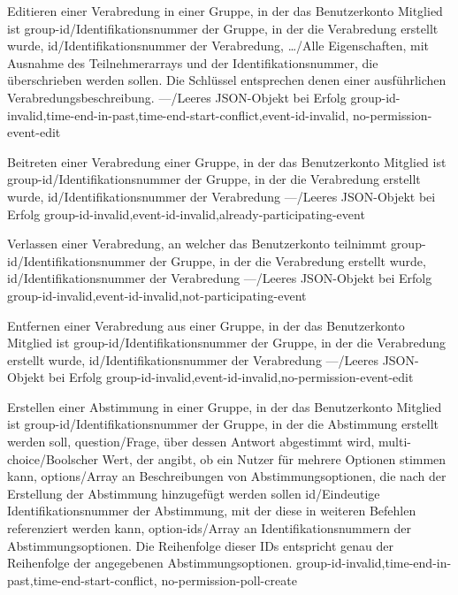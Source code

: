 \documentclass[parskip=full,11pt]{scrartcl}
\begin{document}
{Editieren einer Verabredung in einer Gruppe, in der das Benutzerkonto Mitglied
ist}
{group-id/Identifikationsnummer der Gruppe{,} in der die Verabredung erstellt
wurde,
id/Identifikationsnummer der Verabredung,
\dots/Alle Eigenschaften{,} mit Ausnahme des Teilnehmerarrays und der
Identifikationsnummer{,} die überschrieben werden sollen.
Die Schlüssel entsprechen denen einer ausführlichen Verabredungsbeschreibung.}
{---/Leeres JSON-Objekt bei Erfolg}
{group-id-invalid,time-end-in-past,time-end-start-conflict,event-id-invalid,
no-permission-event-edit}

{Beitreten einer Verabredung einer Gruppe, in der das Benutzerkonto Mitglied
ist}
{group-id/Identifikationsnummer der Gruppe{,} in der die Verabredung erstellt
wurde,
id/Identifikationsnummer der Verabredung}
{---/Leeres JSON-Objekt bei Erfolg}
{group-id-invalid,event-id-invalid,already-participating-event}

{Verlassen einer Verabredung, an welcher das Benutzerkonto teilnimmt}
{group-id/Identifikationsnummer der Gruppe{,} in der die Verabredung erstellt
wurde,
id/Identifikationsnummer der Verabredung}
{---/Leeres JSON-Objekt bei Erfolg}
{group-id-invalid,event-id-invalid,not-participating-event}

{Entfernen einer Verabredung aus einer Gruppe, in der das Benutzerkonto
Mitglied ist}
{group-id/Identifikationsnummer der Gruppe{,} in der die Verabredung erstellt
wurde,
id/Identifikationsnummer der Verabredung}
{---/Leeres JSON-Objekt bei Erfolg}
{group-id-invalid,event-id-invalid,no-permission-event-edit}

{Erstellen einer Abstimmung in einer Gruppe, in der das Benutzerkonto Mitglied
ist}
{group-id/Identifikationsnummer der Gruppe{,} in der die Abstimmung erstellt
werden soll,
question/Frage{,} über dessen Antwort abgestimmt wird,
multi-choice/Boolscher Wert{,} der angibt{,} ob ein Nutzer für mehrere
Optionen stimmen kann,
options/Array an Beschreibungen von Abstimmungsoptionen{,} die nach der
Erstellung der Abstimmung hinzugefügt werden sollen}
{id/Eindeutige Identifikationsnummer der Abstimmung{,} mit der diese in
weiteren Befehlen referenziert werden kann,
option-ids/Array an Identifikationsnummern der Abstimmungsoptionen. Die
Reihenfolge dieser IDs entspricht genau der Reihenfolge der angegebenen
Abstimmungsoptionen.}
{group-id-invalid,time-end-in-past,time-end-start-conflict,
no-permission-poll-create}
\end{document}
